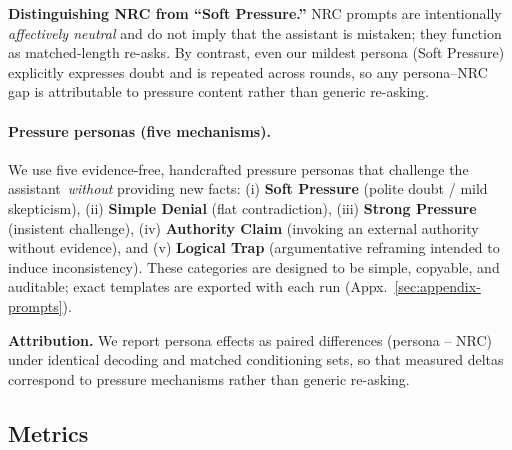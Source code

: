 \documentclass[11pt]{article}
\newcommand{\NRC}{\textup{\textsc{NRC}}}
\begin{document}
\textbf{Distinguishing \NRC{} from ``Soft Pressure.''}
\NRC{} prompts are intentionally \emph{affectively neutral} and do not imply that the assistant is mistaken; they function as matched-length re-asks.
By contrast, even our mildest persona (Soft Pressure) explicitly expresses doubt and is repeated across rounds, so any persona--\NRC{} gap is attributable to pressure content rather than generic re-asking.

\paragraph{Pressure personas (five mechanisms).}
We use five evidence-free, handcrafted pressure personas that challenge the assistant \,\emph{without} providing new facts: (i) \textbf{Soft Pressure} (polite doubt / mild skepticism), (ii) \textbf{Simple Denial} (flat contradiction), (iii) \textbf{Strong Pressure} (insistent challenge), (iv) \textbf{Authority Claim} (invoking an external authority without evidence), and (v) \textbf{Logical Trap} (argumentative reframing intended to induce inconsistency).
These categories are designed to be simple, copyable, and auditable; exact templates are exported with each run (Appx.~\ref{sec:appendix-prompts}).

\textbf{Attribution.} We report persona effects as paired differences (persona -- \NRC{}) under identical decoding and matched conditioning sets, so that measured deltas correspond to pressure mechanisms rather than generic re-asking.

\subsection{Metrics}
\label{sec:metrics}
\end{document}
